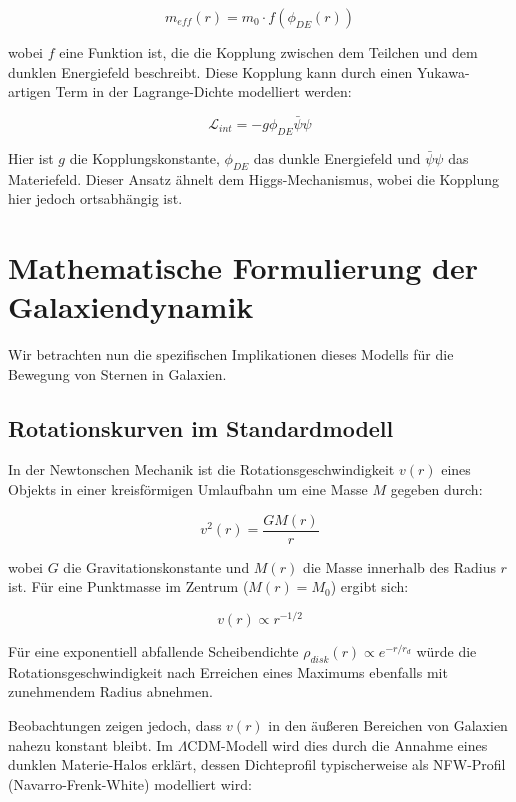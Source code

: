 \documentclass[a4paper,12pt]{article}
\begin{document}
	\begin{equation}
		m_{eff}(r) = m_0 \cdot f(\phi_{DE}(r))
	\end{equation}
	
	wobei $f$ eine Funktion ist, die die Kopplung zwischen dem Teilchen und dem dunklen Energiefeld beschreibt. Diese Kopplung kann durch einen Yukawa-artigen Term in der Lagrange-Dichte modelliert werden:
	
	\begin{equation}
		\mathcal{L}_{int} = -g \phi_{DE} \bar{\psi}\psi
	\end{equation}
	
	Hier ist $g$ die Kopplungskonstante, $\phi_{DE}$ das dunkle Energiefeld und $\bar{\psi}\psi$ das Materiefeld. Dieser Ansatz ähnelt dem Higgs-Mechanismus, wobei die Kopplung hier jedoch ortsabhängig ist.\\
	
	\section{Mathematische Formulierung der Galaxiendynamik}
	
	Wir betrachten nun die spezifischen Implikationen dieses Modells für die Bewegung von Sternen in Galaxien.
	
	\subsection{Rotationskurven im Standardmodell}
	
	In der Newtonschen Mechanik ist die Rotationsgeschwindigkeit $v(r)$ eines Objekts in einer kreisförmigen Umlaufbahn um eine Masse $M$ gegeben durch:
	
	\begin{equation}
		v^2(r) = \frac{GM(r)}{r}
	\end{equation}
	
	wobei $G$ die Gravitationskonstante und $M(r)$ die Masse innerhalb des Radius $r$ ist. Für eine Punktmasse im Zentrum ($M(r) = M_0$) ergibt sich:
	
	\begin{equation}
		v(r) \propto r^{-1/2}
	\end{equation}
	
	Für eine exponentiell abfallende Scheibendichte $\rho_{disk}(r) \propto e^{-r/r_d}$ würde die Rotationsgeschwindigkeit nach Erreichen eines Maximums ebenfalls mit zunehmendem Radius abnehmen.
	
	Beobachtungen zeigen jedoch, dass $v(r)$ in den äußeren Bereichen von Galaxien nahezu konstant bleibt. Im $\Lambda$CDM-Modell wird dies durch die Annahme eines dunklen Materie-Halos erklärt, dessen Dichteprofil typischerweise als NFW-Profil (Navarro-Frenk-White) modelliert wird:
	
\end{document}
